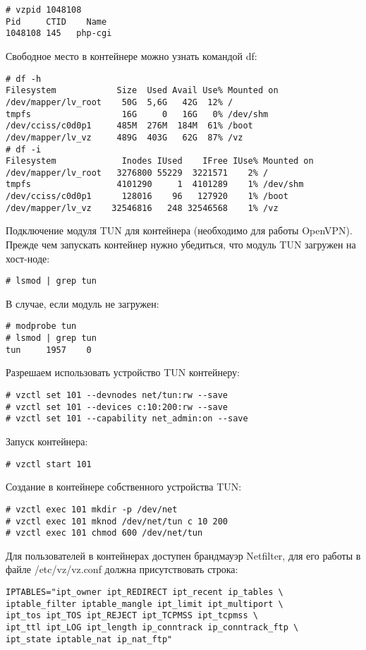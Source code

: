 \begin{lstlisting}
# vzpid 1048108
Pid	    CTID	Name
1048108	145	  php-cgi
\end{lstlisting}
Свободное место в контейнере можно узнать командой df:
\begin{lstlisting}
# df -h
Filesystem            Size  Used Avail Use% Mounted on
/dev/mapper/lv_root    50G  5,6G   42G  12% /
tmpfs                  16G     0   16G   0% /dev/shm
/dev/cciss/c0d0p1     485M  276M  184M  61% /boot
/dev/mapper/lv_vz     489G  403G   62G  87% /vz
# df -i
Filesystem             Inodes IUsed    IFree IUse% Mounted on
/dev/mapper/lv_root   3276800 55229  3221571    2% /
tmpfs                 4101290     1  4101289    1% /dev/shm
/dev/cciss/c0d0p1      128016    96   127920    1% /boot
/dev/mapper/lv_vz    32546816   248 32546568    1% /vz
\end{lstlisting}
Подключение модуля TUN для контейнера (необходимо для работы OpenVPN).
Прежде чем запускать контейнер нужно убедиться, что модуль TUN загружен на хост-ноде:
\begin{lstlisting}
# lsmod | grep tun
\end{lstlisting}
В случае, если модуль не загружен:
\begin{lstlisting}
# modprobe tun
# lsmod | grep tun
tun     1957    0
\end{lstlisting}
Разрешаем использовать устройство TUN контейнеру:
\begin{lstlisting}
# vzctl set 101 --devnodes net/tun:rw --save
# vzctl set 101 --devices c:10:200:rw --save
# vzctl set 101 --capability net_admin:on --save
\end{lstlisting}
Запуск контейнера:
\begin{lstlisting}
# vzctl start 101
\end{lstlisting}
Создание в контейнере собственного устройства TUN:
\begin{lstlisting}
# vzctl exec 101 mkdir -p /dev/net
# vzctl exec 101 mknod /dev/net/tun c 10 200
# vzctl exec 101 chmod 600 /dev/net/tun
\end{lstlisting}
Для пользователей в контейнерах доступен брандмауэр Netfilter, для его работы в файле /etc/vz/vz.conf должна присутствовать строка:
\begin{lstlisting}
IPTABLES="ipt_owner ipt_REDIRECT ipt_recent ip_tables \
iptable_filter iptable_mangle ipt_limit ipt_multiport \
ipt_tos ipt_TOS ipt_REJECT ipt_TCPMSS ipt_tcpmss \
ipt_ttl ipt_LOG ipt_length ip_conntrack ip_conntrack_ftp \
ipt_state iptable_nat ip_nat_ftp"
\end{lstlisting}
